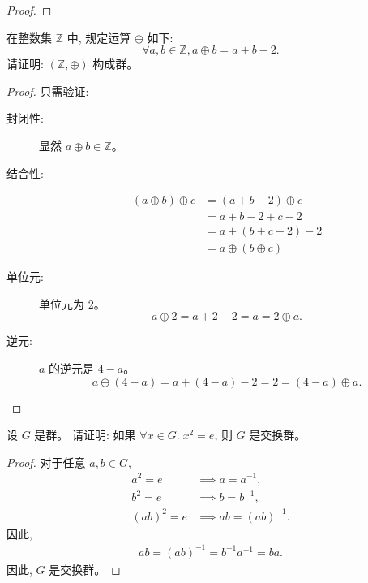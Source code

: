 \documentclass[a4paper, justified]{tufte-handout}
\begin{document}
\begin{proof}
\end{proof}

\begin{problem}
  在整数集 $\mathbb{Z}$ 中, 规定运算 $\oplus$ 如下:
  \[
    \forall a, b \in \mathbb{Z}, a \oplus b = a + b - 2.
  \]
  请证明: $(\mathbb{Z}, \oplus)$ 构成群。
\end{problem}

\begin{proof}
  只需验证:
  \begin{description}
    \item[封闭性:] 显然 $a \oplus b \in \mathbb{Z}$。
    \item[结合性:]
      \begin{align*}
        (a \oplus b) \oplus c &= (a + b - 2) \oplus c \\
          &= a + b - 2 + c - 2 \\
          &= a + (b + c - 2) - 2 \\
          &= a \oplus (b \oplus c)
      \end{align*}
    \item[单位元:] 单位元为 2。
      \[
        a \oplus 2 = a + 2 - 2 = a = 2 \oplus a.
      \]
    \item[逆元:] $a$ 的逆元是 $4-a$。
      \[
        a \oplus (4 - a) = a + (4 - a) - 2 = 2 = (4 - a) \oplus a.
      \]
  \end{description}
\end{proof}

\begin{problem}
  设 $G$ 是群。
  请证明: 如果 $\forall x \in G.\; x^2 = e$,
  则 $G$ 是交换群。
\end{problem}

\begin{proof}
  对于任意 $a, b \in G$,
  \begin{align*}
    a^{2} = e &\implies a = a^{-1}, \\
    b^{2} = e &\implies b = b^{-1}, \\
    (ab)^{2} = e &\implies ab = (ab)^{-1}.
  \end{align*}
  因此,
  \begin{align*}
    ab = (ab)^{-1} = b^{-1} a^{-1} = ba.
  \end{align*}
  因此, $G$ 是交换群。
\end{proof}
\end{document}
